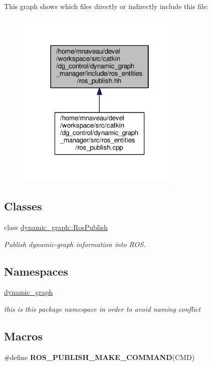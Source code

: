 This graph shows which files directly or indirectly include this file\+:\nopagebreak
\begin{figure}[H]
\begin{center}
\leavevmode
\includegraphics[width=226pt]{ros__publish_8hh__dep__incl}
\end{center}
\end{figure}
\subsection*{Classes}
\begin{DoxyCompactItemize}
\item 
class \hyperlink{classdynamic__graph_1_1RosPublish}{dynamic\+\_\+graph\+::\+Ros\+Publish}
\begin{DoxyCompactList}\small\item\em Publish dynamic-\/graph information into R\+OS. \end{DoxyCompactList}\end{DoxyCompactItemize}
\subsection*{Namespaces}
\begin{DoxyCompactItemize}
\item 
 \hyperlink{namespacedynamic__graph}{dynamic\+\_\+graph}
\begin{DoxyCompactList}\small\item\em this is this package namespace in order to avoid naming conflict \end{DoxyCompactList}\end{DoxyCompactItemize}
\subsection*{Macros}
\begin{DoxyCompactItemize}
\item 
\#define {\bfseries R\+O\+S\+\_\+\+P\+U\+B\+L\+I\+S\+H\+\_\+\+M\+A\+K\+E\+\_\+\+C\+O\+M\+M\+A\+ND}(C\+MD)
\end{DoxyCompactItemize}
